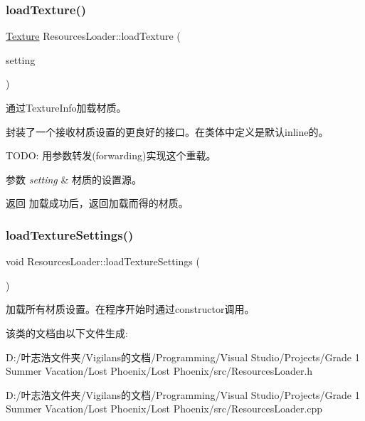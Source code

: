 \subsubsection{\texorpdfstring{load\+Texture()}{loadTexture()}\hspace{0.1cm}{\footnotesize\ttfamily [2/2]}}
{\footnotesize\ttfamily \hyperlink{struct_texture}{Texture} Resources\+Loader\+::load\+Texture (\begin{DoxyParamCaption}\item[{\hyperlink{struct_settings_1_1_texture_info}{Settings\+::\+Texture\+Info}}]{setting }\end{DoxyParamCaption})\hspace{0.3cm}{\ttfamily [inline]}}



通过Texture\+Info加载材质。 

封装了一个接收材质设置的更良好的接口。在类体中定义是默认inline的。

T\+O\+DO\+: 用参数转发(forwarding)实现这个重载。 


\begin{DoxyParams}{参数}
{\em setting} & 材质的设置源。 \\
\hline
\end{DoxyParams}
\begin{DoxyReturn}{返回}
加载成功后，返回加载而得的材质。 
\end{DoxyReturn}
\mbox{\label{class_resources_loader_a80e1d1bb8339e48b0becf401f205436e}} 
\subsubsection{\texorpdfstring{load\+Texture\+Settings()}{loadTextureSettings()}}
{\footnotesize\ttfamily void Resources\+Loader\+::load\+Texture\+Settings (\begin{DoxyParamCaption}{ }\end{DoxyParamCaption})}



加载所有材质设置。在程序开始时通过constructor调用。 



该类的文档由以下文件生成\+:\begin{DoxyCompactItemize}
\item 
D\+:/叶志浩文件夹/\+Vigilans的文档/\+Programming/\+Visual Studio/\+Projects/\+Grade 1 Summer Vacation/\+Lost Phoenix/\+Lost Phoenix/src/Resources\+Loader.\+h\item 
D\+:/叶志浩文件夹/\+Vigilans的文档/\+Programming/\+Visual Studio/\+Projects/\+Grade 1 Summer Vacation/\+Lost Phoenix/\+Lost Phoenix/src/Resources\+Loader.\+cpp\end{DoxyCompactItemize}
